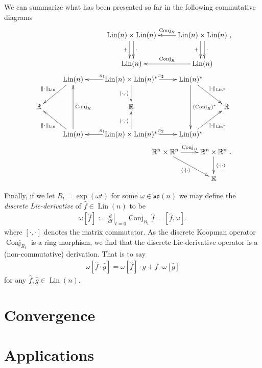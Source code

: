 \documentclass[12pt]{amsart}
\newcommand{\R}{\ensuremath{\mathbb{R}}}
\DeclareMathOperator{\Lin}{Lin}
\DeclareMathOperator{\Conj}{Conj}
\begin{document}
We can summarize what has been presented so far in the following commutative diagrams
\begin{align*}
	\xymatrix{
		\Lin(n) \times \Lin(n)  \ar@<-0.6ex>[d]_{+} \ar@<0.6ex>[d]^{\cdot} & \ar[l]_{\Conj_R} \Lin(n) \times \Lin(n)  \ar@<-0.6ex>[d]_{+} \ar@<0.6ex>[d]^{\cdot} \\
		\Lin(n)  & \ar[l]_{\Conj_R} \Lin(n)
	}, \\
	\xymatrix{
		& \ar[dl]_{\| \cdot \|_{\Lin}} \Lin(n) & \ar[l]_{\pi_1} \Lin(n)\times \Lin(n)^* \ar[d]_{\langle \cdot , \cdot \rangle} \ar[r]^{\pi_2} & \Lin(n)^*   \ar[dd]^{(\Conj_R)^*} \ar[dr]^{\| \cdot \|_{\Lin^*}}& \\
		\mathbb{R} && \mathbb{R} && \mathbb{R} \\
		& \ar[ul]^{\| \cdot \|_{\Lin}} \Lin(n) \ar[uu]_{\Conj_R} & \ar[l]_{\pi_1} \Lin(n)\times \Lin(n)^* \ar[u]^{\langle \cdot , \cdot \rangle} \ar[r]^{\pi_2} & \Lin(n)^* \ar[ur]_{\| \cdot \|_{\Lin^*}} &	
	} \\
	\xymatrix{
		\R^n \times \R^n \ar[dr]_{\langle \cdot \mid \cdot \rangle} \ar[r]^{\Conj_R} & \R^n \times \R^n \ar[d]^{\langle \cdot \mid \cdot \rangle} \\
		&\mathbb{R}
	}	.
\end{align*}



Finally, if we let $R_t = \exp( \omega t)$ for some $\omega \in \mathfrak{so}(n)$
we may define the \emph{discrete Lie-derivative} of $\hat{f} \in \Lin(n)$ to be
\begin{align*}
	\omega[ \hat{f}] := \left. \frac{d}{d t} \right|_{t=0} \Conj_{R_t} \hat{f} = [ \hat{f} , \omega].
\end{align*}
where $[ \cdot , \cdot ]$ denotes the matrix commutator.
As the discrete Koopman operator $\Conj_{R_t}$ is a ring-morphism, we find that the discrete Lie-derivative operator is a (non-commutative) derivation.
That is to say
\begin{align*}
	\omega[ \hat{f} \cdot \hat{g} ] = \omega[ \hat{f}] \cdot g + f \cdot \omega[\hat{g}]
\end{align*}
for any $\hat{f},\hat{g} \in \Lin(n)$.


\section{Convergence}
\label{sec:convergence}

\section{Applications}
\end{document}
